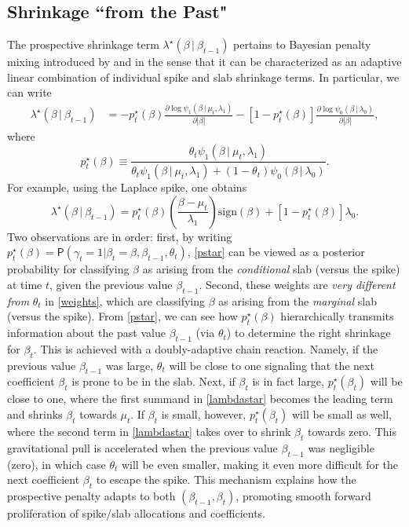 \documentclass[ba]{imsart}
\numberwithin{equation}{section}
\theoremstyle{plain}
\renewcommand{\P}{\mathsf{P}}
\def\C {\,|\:}
\def\C {\,|\:}
\begin{document}
\subsection{Shrinkage ``from the Past"}\label{sec:prosp}
The prospective shrinkage term $\lambda^\star(\beta\C\beta_{t-1})$ pertains to Bayesian penalty mixing introduced by \cite{rockova15} and \cite{SSL} in the sense that it can be characterized as an adaptive linear combination of individual spike and slab shrinkage terms. In particular, we can write
\begin{align}
\lambda^\star(\beta\C\beta_{t-1})&=-p^\star_t(\beta)\frac{\partial\log \psi_1(\beta\C\mu_{t},\lambda_1)}{\partial|\beta|}-[1-p^\star_{t}(\beta)]\frac{\partial\log \psi_0(\beta\C\lambda_0)}{\partial|\beta|},
\end{align}
where 
\begin{equation}\label{pstar}
p^\star_{t}(\beta)\equiv\frac{\theta_{t}  \psi_1(\beta\C\mu_{t},\lambda_1)}{\theta_{t}  \psi_1(\beta\C\mu_{t},\lambda_1)+(1-\theta_{t}) \psi_0(\beta\C\lambda_0)}.
\end{equation}
For example, using the Laplace spike, one obtains
$$
\lambda^\star(\beta\C\beta_{t-1})=p^\star_t(\beta)\left(\frac{\beta-\mu_t}{\lambda_1}\right)\mathrm{sign}(\beta)+[1-p_t^\star(\beta)]\lambda_0\label{lambdastar}.
$$
Two observations are in order: first, by writing $p^\star_{t}(\beta)=\P(\gamma_{t}=1|\beta_t=\beta,\beta_{t-1},\theta_t)$, \eqref{pstar} can be viewed as a posterior probability for classifying $\beta$ as arising from the {\sl conditional} slab (versus  the spike) at  time $t$,  given the previous value $\beta_{t-1}$.  Second, these weights are {\sl very different from} $\theta_{t}$ in \eqref{weights}, which are classifying $\beta$  as arising from the {\sl marginal} slab (versus the spike). 
From \eqref{pstar}, we can see how $p_{t}^\star(\beta)$ hierarchically transmits information about the past value $\beta_{t-1}$ (via  $\theta_t$) to determine the right shrinkage for  $\beta_t$. This is achieved with a doubly-adaptive  chain reaction. %
Namely, if the previous value $\beta_{t-1}$ was large, $\theta_t$ will be close to one signaling that the next coefficient $\beta_t$ is prone to be in the slab.  Next,  if $\beta_t$ is in fact  large, $p^\star_t(\beta_t)$  will be close to one, where the first summand in \eqref{lambdastar}  becomes the leading term and  shrinks $\beta_t$ towards $\mu_t$. If $\beta_t$ is small, however, $p^\star_t(\beta_t)$ will be  small as well, where the second term in \eqref{lambdastar} takes over to shrink $\beta_t$ towards zero. This gravitational pull is accelerated when the previous value $\beta_{t-1}$ was negligible (zero), in which case $\theta_t$ will be even smaller, making it even more difficult for the next coefficient $\beta_t$ to escape the spike. This mechanism explains how the prospective penalty adapts to both $(\beta_{t-1},\beta_t)$, promoting smooth forward proliferation of spike/slab  allocations and coefficients.
\end{document}
